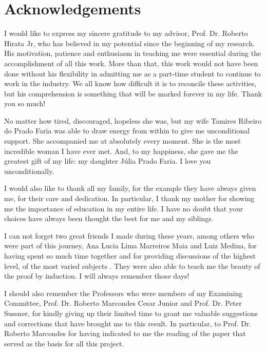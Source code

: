 \documentclass[11pt,twoside,a4paper]{book}
\theoremstyle{plain}
\theoremstyle{definition}
\begin{document}



\chapter*{Acknowledgements}
I would like to express my sincere gratitude to my advisor, Prof. Dr. Roberto Hirata Jr, who has believed in my potential since the beginning of my research. His motivation, patience and enthusiasm in teaching me were essential during the accomplishment of all this work. More than that, this work would not have been done without his flexibility in admitting me as a part-time student to continue to work in the industry. We all know how difficult it is to reconcile these activities, but his comprehension is something that will be marked forever in my life. Thank you so much!

No matter how tired, discouraged, hopeless she was, but my wife Tamires Ribeiro do Prado Faria was able to draw energy from within to give me unconditional support. She accompanied me at absolutely every moment. She is the most incredible woman I have ever met. And, to my happiness, she gave me the greatest gift of my life: my daughter Júlia Prado Faria. I love you unconditionally.

I would also like to thank all my family, for the example they have always given me, for their care and dedication. In particular, I thank my mother for showing me the importance of education in my entire life. I have no doubt that your choices have always been thought the best for me and my siblings.

I can not forget two great friends I made during these years, among others who were part of this journey, Ana Lucia Lima Marreiros Maia and Luiz Medina, for having spent so much time together and for providing discussions of the highest level, of the most varied subjects . They were also able to teach me the beauty of the proof by induction. I will always remember those days!

I should also remember the Professors who were members of my Examining Committee, Prof. Dr. Roberto Marcondes Cesar Junior and Prof. Dr. Peter Sussner, for kindly giving up their limited time to grant me valuable suggestions and corrections that have brought me to this result. In particular, to Prof. Dr. Roberto Marcondes for having indicated to me the reading of the paper that served as the basis for all this project.
\end{document}
